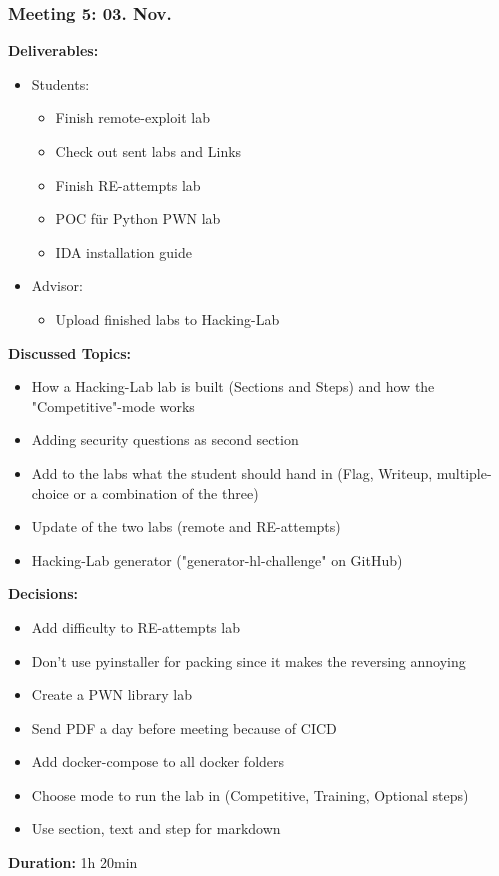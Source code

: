 \subsubsection*{Meeting 5: 03. Nov.}
\textbf{Deliverables:}
\begin{itemize}
    \item Students:
    \begin{itemize}
        \item Finish remote-exploit lab
        \item Check out sent labs and Links
        \item Finish RE-attempts lab
        \item POC für Python PWN lab
        \item IDA installation guide
    \end{itemize}
    \item Advisor:
    \begin{itemize}
        \item Upload finished labs to Hacking-Lab
    \end{itemize}
\end{itemize} 
\textbf{Discussed Topics:}
\begin{itemize}
    \item How a Hacking-Lab lab is built (Sections and Steps) and how the "Compe\-titive"-mode works
    \item Adding security questions as second section
    \item Add to the labs what the student should hand in (Flag, Writeup, multiple-choice or a combination of the three)
    \item Update of the two labs (remote and RE-attempts)
    \item Hacking-Lab generator ("generator-hl-challenge" on GitHub)
\end{itemize}
\textbf{Decisions:}
\begin{itemize}
    \item Add difficulty to RE-attempts lab
    \item Don't use pyinstaller for packing since it makes the reversing annoying
    \item Create a PWN library lab
    \item Send PDF a day before meeting because of CICD
    \item Add docker-compose to all docker folders
    \item Choose mode to run the lab in (Competitive, Training, Optional steps)
    \item Use section, text and step for markdown
\end{itemize}
\textbf{Duration:} 1h 20min

